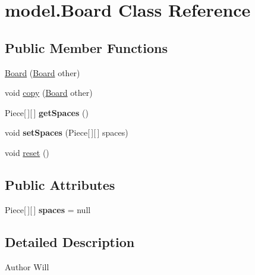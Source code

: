\hypertarget{classmodel_1_1Board}{\section{model.\-Board Class Reference}
\label{classmodel_1_1Board}
}
\subsection*{Public Member Functions}
\begin{DoxyCompactItemize}
\item 
\hyperlink{classmodel_1_1Board_aac7c0f18953f62b56fe1631dedc218ea}{Board} (\hyperlink{classmodel_1_1Board}{Board} other)
\item 
void \hyperlink{classmodel_1_1Board_ac230b4f661035db4d987134a91ab5cd4}{copy} (\hyperlink{classmodel_1_1Board}{Board} other)
\item 
\hypertarget{classmodel_1_1Board_a63d8dd9b3dc145e23e0d41295db354f3}{Piece\mbox{[}$\,$\mbox{]}\mbox{[}$\,$\mbox{]} {\bfseries get\-Spaces} ()}\label{classmodel_1_1Board_a63d8dd9b3dc145e23e0d41295db354f3}

\item 
\hypertarget{classmodel_1_1Board_a13f1f3a8a516e662029745977b45225d}{void {\bfseries set\-Spaces} (Piece\mbox{[}$\,$\mbox{]}\mbox{[}$\,$\mbox{]} spaces)}\label{classmodel_1_1Board_a13f1f3a8a516e662029745977b45225d}

\item 
void \hyperlink{classmodel_1_1Board_ab04268464780a556231843bfaca1f7bc}{reset} ()
\end{DoxyCompactItemize}
\subsection*{Public Attributes}
\begin{DoxyCompactItemize}
\item 
\hypertarget{classmodel_1_1Board_a2f1a9f701bbe38b93555d41ce47eef47}{Piece\mbox{[}$\,$\mbox{]}\mbox{[}$\,$\mbox{]} {\bfseries spaces} = null}\label{classmodel_1_1Board_a2f1a9f701bbe38b93555d41ce47eef47}

\end{DoxyCompactItemize}


\subsection{Detailed Description}
\begin{DoxyAuthor}{Author}
Will 
\end{DoxyAuthor}


